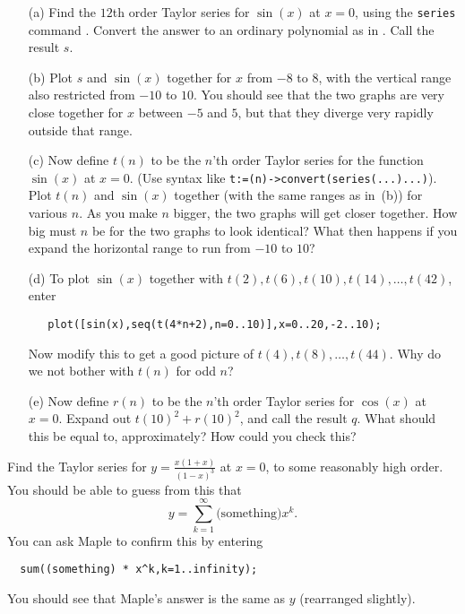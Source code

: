 \documentclass[a4paper,10pt]{amsbook}
\numberwithin{example}{chapter}
\begin{document}
\begin{exercise}\label{ex-sin}
 \begin{itemize}
  \item[(a)] Find the $12$th order Taylor series for
   $\sin(x)$ at $x=0$, using the \verb~series~ command
   \note{\NOTEtaylor}.  Convert the answer to an ordinary
   polynomial as in \note{\NOTEtaylorconv}. Call the result $s$. 
  \item[(b)] Plot $s$ and $\sin(x)$ together
   \note{\NOTEtwoplots} for $x$ from
   $-8$ to $8$, with the vertical range also restricted
   \note{\NOTEvertrange}  from $-10$ to $10$.  You should see that
   the two graphs are very close together for $x$ between
   $-5$ and $5$, but that they diverge very rapidly outside
   that range. 
  \item[(c)] Now define $t(n)$ to be the $n$'th order Taylor
   series for the function $\sin(x)$ at $x=0$.  (Use syntax like 
   \verb~t:=(n)->convert(series(...)...)~).  Plot $t(n)$ and
   $\sin(x)$ together (with the same ranges as in~(b)) for
   various $n$.  As you make $n$ bigger, the two graphs will
   get closer together.  How big must $n$ be for the two
   graphs to look identical?  What then happens if you
   expand the horizontal range to run from $-10$ to $10$? 
  \item[(d)] To plot $\sin(x)$ together with
   $t(2),t(6),t(10),t(14),\ldots,t(42)$, enter
\begin{verbatim}
   plot([sin(x),seq(t(4*n+2),n=0..10)],x=0..20,-2..10);
\end{verbatim}
   Now modify this to get a good picture of
   $t(4),t(8),\ldots,t(44)$.  Why do we not bother with
   $t(n)$ for odd $n$? 
  \item[(e)] Now define $r(n)$ to be the $n$'th order Taylor
   series for $\cos(x)$ at $x=0$.  Expand out
   $t(10)^2+r(10)^2$, and call the result $q$.  What should
   this be equal to, approximately?  How could you check this? 
 \end{itemize}
\end{exercise}

\begin{exercise}\label{ex-rat}
 Find the Taylor series for $y=\frac{x(1+x)}{(1-x)^3}$ at
 $x=0$, to some reasonably high order.  You should be able
 to guess from this that
 \[ y = \sum_{k=1}^\infty \text{(something)} x^k. \]
 You can ask Maple to confirm this by entering
\begin{verbatim}
  sum((something) * x^k,k=1..infinity);
\end{verbatim}
 You should see that Maple's answer is the same as $y$
 (rearranged slightly). 
\end{exercise}
\end{document}
